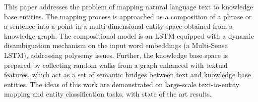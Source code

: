 This paper addresses the problem of mapping natural language text to knowledge base entities. The mapping process is approached as a composition of a phrase or a sentence into a point in a multi-dimensional entity space obtained from a knowledge graph. The compositional model is an LSTM equipped with a dynamic disambiguation mechanism on the input word embeddings (a Multi-Sense LSTM), addressing polysemy issues. Further, the knowledge base space is prepared by collecting random walks from a graph enhanced with textual features, which act as a set of semantic bridges between text and knowledge base entities. The ideas of this work are demonstrated on large-scale text-to-entity mapping and entity classification tasks, with state of the art results.
